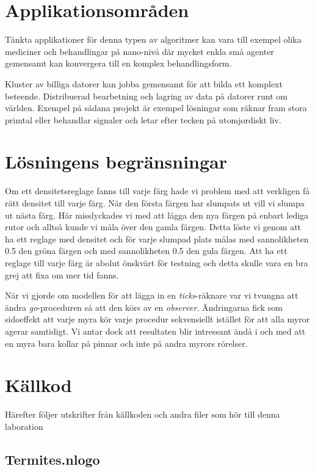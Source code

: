 \documentclass[titlepage, a4paper, 12pt]{article}
\begin{document}
\section{Applikationsområden}

Tänkta applikationer för denna typen av algoritmer kan vara till
exempel olika mediciner och behandlingar på nano-nivå där mycket enkla
små agenter gemensamt kan konvergera till en komplex behandlingsform.

Kluster av billiga datorer kan jobba gemensamt för att bilda ett
komplext beteende. Distribuerad bearbetning och lagring av data på
datorer runt om världen. Exempel på sådana projekt är exempel
lösningar som räknar fram stora primtal eller behandlar signaler och
letar efter tecken på utomjordiskt liv.

\section{Lösningens begränsningar}
Om ett densitetsreglage fanns till varje färg hade vi problem med att
verkligen få rätt densitet till varje färg. När den första färgen har
slumpats ut vill vi slumpa ut nästa färg. Här misslyckades vi med att
lägga den nya färgen på enbart lediga rutor och alltså kunde vi måla
över den gamla färgen. Detta löste vi genom att ha ett reglage med
densitet och för varje slumpad plats målas med sannolikheten 0.5 den
gröna färgen och med sannolikheten 0.5 den gula färgen. Att ha ett
reglage till varje färg är abolut önskvärt för testning och detta
skulle vara en bra grej att fixa om mer tid fanns.

När vi gjorde om modellen för att lägga in en \textit{ticks}-räknare
var vi tvungna att ändra \textit{go}-proceduren så att den körs av en
\textit{observer}. Ändringarna fick som sidoeffekt att varje myra kör
varje procedur sekvensiellt istället för att alla myror agerar
samtidigt. Vi antar dock att resultaten blir intressant ändå i och med
att en myra bara kollar på pinnar och inte på andra myrors
rörelser. %

\newpage
\appendix
{}
\section{Källkod}\label{sec:kallkod}
Härefter följer utskrifter från källkoden och andra filer som hör till
denna laboration

\subsection{Termites.nlogo}\label{Termites.nlogo}
\begin{footnotesize}
  
\end{footnotesize}
\end{document}
